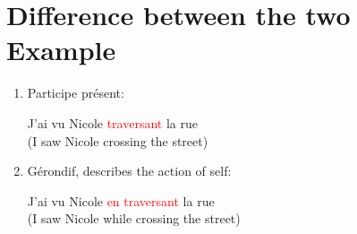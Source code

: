 \documentclass{book}
\begin{document}
    \section{Difference between the two Example}
        \begin{enumerate}
            \item Participe présent:
                \begin{center}
                    J'ai vu Nicole \textcolor{red}{traversant} la rue \\
                    (I saw Nicole crossing the street)
                \end{center}

            \item Gérondif, describes the action of self:
                \begin{center}
                    J'ai vu Nicole \textcolor{red}{en traversant} la rue \\
                    (I saw Nicole while crossing the street)
                \end{center}
        \end{enumerate}
\end{document}
